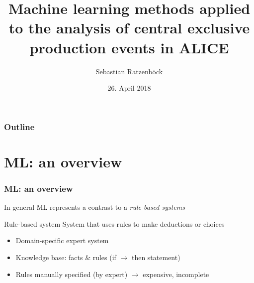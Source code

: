 \documentclass{beamer}
\title[Introduction to Machine learning] %
{Machine learning methods applied to the analysis of central exclusive production events in ALICE}
\author[Ratzenböck] %
{Sebastian Ratzenböck\inst{1}}
\institute[SMI] %
{
\inst{1}%
Stefan Meyer Institut\\
Österreichische Akademie der Wissenschaften
}
\date[26.April 2018] %
{26. April 2018}
\begin{document}
\frame{\titlepage}


\begin{frame}
    \frametitle{Outline}
    \tableofcontents
\end{frame}

\section{ML: an overview} %

\begin{frame}
    \frametitle{ML: an overview}
    In general ML represents a contrast to a \emph{rule based systems}
    \begin{block}{Rule-based system}
        System that uses rules to make deductions or choices
        \begin{itemize}
            \item<1-> Domain-specific expert system
            \item<2-> Knowledge base: facts \& rules (if $\to$ then statement)
            \item<3-> Rules manually specified (by expert) $\to$ expensive, incomplete
        \end{itemize}
    \end{block}
\end{frame}



\end{document}
